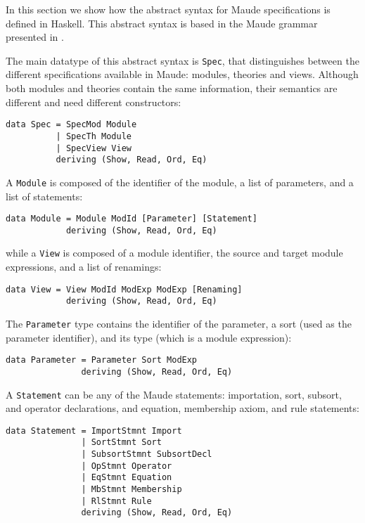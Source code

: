 
In this section we show how the abstract syntax for Maude specifications
is defined in Haskell. This abstract syntax is based in the Maude grammar presented
in \cite[Chapter 24]{maude-book}.

The main datatype of this abstract syntax is \verb"Spec", that
distinguishes between the different specifications available in Maude:
modules, theories and views. Although both modules and theories contain
the same information, their semantics are different and need different
constructors:

{\codesize
\begin{verbatim}
data Spec = SpecMod Module
          | SpecTh Module
          | SpecView View
          deriving (Show, Read, Ord, Eq)
\end{verbatim}
}

A \verb"Module" is composed of the identifier of the module, a list
of parameters, and a list of statements:

{\codesize
\begin{verbatim}
data Module = Module ModId [Parameter] [Statement]
            deriving (Show, Read, Ord, Eq)
\end{verbatim}
}

\noindent while a \verb"View" is composed of a module identifier, the
source and target module expressions, and a list of renamings:

{\codesize
\begin{verbatim}
data View = View ModId ModExp ModExp [Renaming]
            deriving (Show, Read, Ord, Eq)
\end{verbatim}
}

The \verb"Parameter" type contains the identifier of the parameter,
a sort (used as the parameter identifier), and its type (which is a
module expression):

{\codesize
\begin{verbatim}
data Parameter = Parameter Sort ModExp
               deriving (Show, Read, Ord, Eq)
\end{verbatim}
}

A \verb"Statement" can be any of the Maude statements:
importation, sort, subsort, and operator declarations, and
equation, membership axiom, and rule statements:

{\codesize
\begin{verbatim}
data Statement = ImportStmnt Import
               | SortStmnt Sort
               | SubsortStmnt SubsortDecl
               | OpStmnt Operator
               | EqStmnt Equation
               | MbStmnt Membership
               | RlStmnt Rule
               deriving (Show, Read, Ord, Eq)
\end{verbatim}
}

